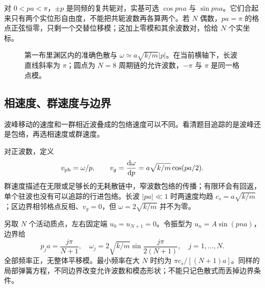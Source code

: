 对 $0<pa<\pi$，$\pm p$ 是同频的复共轭对，实基可选 $\cos pna$ 与 $\sin pna$。它们合起来只有两个实位形自由度，不能把共轭波数再各算两个。若 $N$ 偶数，$pa=\pi$ 的格点正弦恒零，只剩一个交替位移模；这加上零模和其余波数对，恰给 $N$ 个实坐标。

\begin{figure}[htbp]
\centering
{}
\caption{第一布里渊区内的准确色散与 $\omega\simeq a\sqrt{k/m}|p|$。在当前横轴下，长波直线斜率为 $\pi$；圆点为 $N=8$ 周期链的允许波数，$-\pi$ 与 $\pi$ 是同一格点模。}
\label{fig:dispersion}
\end{figure}

\subsection{相速度、群速度与边界}
波峰移动的速度和一群相近波叠成的包络速度可以不同。看清题目追踪的是波峰还是包络，再选相速度或群速度。

对正波数，定义
\[
v_{\rm ph}=\omega/p,\qquad
v_g=\frac{\mathrm{d}\omega}{\mathrm{d} p}=a\sqrt{k/m}\cos(pa/2).
\]
群速度描述在无限或足够长的无耗散链中，窄波数包络的传播；有限环会有回返，单个驻波也没有可以追踪的行进包络。长波 $|pa|\ll1$ 时两速度均趋 $c_s=a\sqrt{k/m}$；区边界相邻格点反相、$v_g=0$，但 $\omega=2\sqrt{k/m}$ 并不为零。

\begin{example}[固定端与周期端不可混用]
另取 $N$ 个活动质点，左右固定端 $u_0=u_{N+1}=0$。令振型为 $u_n=A\sin(pna)$，边界给
\[
p_j a=\frac{j\pi}{N+1},\quad
\omega_j=2\sqrt{k/m}\sin\frac{j\pi}{2(N+1)},\quad j=1,\ldots,N.
\]
全部频率正，无整体平移模。最小频率在大 $N$ 时约为 $\pi c_s/[(N+1)a]$。同样的局部弹簧方程，不同边界改变允许波数和模态形状；不能只记色散式而丢掉边界条件。
\end{example}

